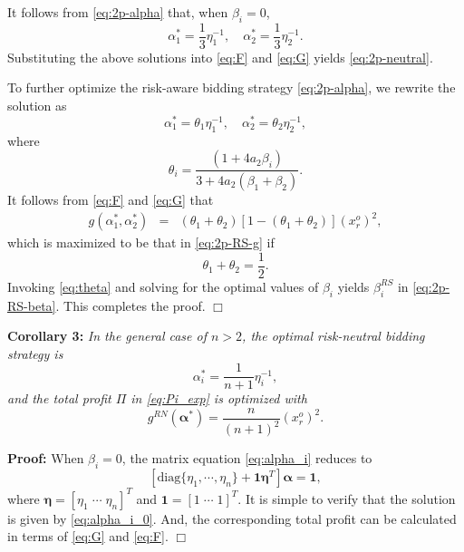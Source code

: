 \documentclass[conference]{IEEEtran}
\newcommand{\one}{\mathbf{1}}
\begin{document}
It follows from \eqref{eq:2p-alpha} that, when $\beta_i=0$,
\[ \alpha_1^* = \frac{1}{3}\eta_1^{-1}, \quad \alpha_2^* = \frac{1}{3}\eta_2^{-1}. \]
Substituting the above solutions into \eqref{eq:F} and \eqref{eq:G} yields \eqref{eq:2p-neutral}.

To further optimize the risk-aware bidding strategy \eqref{eq:2p-alpha}, we rewrite the solution as
\[ \alpha_1^* = \theta_1 \eta_1^{-1}, \quad \alpha_2^* = \theta_2\eta_2^{-1}, \]
where 
\begin{equation}
    \theta_i = \frac{(1+4a_2\beta_i)}{3+4a_2(\beta_1+\beta_2)}. \label{eq:theta}
\end{equation} 
It follows from \eqref{eq:F} and \eqref{eq:G} that 
\begin{eqnarray*}
    g(\alpha_1^*, \alpha_2^*) & = & (\theta_1+\theta_2) [1- (\theta_1+\theta_2)] (x_r^o)^2, 
\end{eqnarray*}
which is maximized to be that in \eqref{eq:2p-RS-g} if
\[ \theta_1+\theta_2=\frac{1}{2}. \]
Invoking \eqref{eq:theta} and solving for the optimal values of $\beta_i$ yields $\beta_i^{RS}$ in \eqref{eq:2p-RS-beta}. This completes the proof. \hfill $\Box$

\noindent  \textbf{Corollary 3:} {\it In the general case of $n>2$, the optimal risk-neutral bidding strategy is
\begin{equation}
    \alpha_i^* = \frac{1}{n+1}\eta_i^{-1},\label{eq:alpha_i_0} 
\end{equation} 
and the total profit $\Pi$ in \eqref{eq:Pi_exp} is optimized with 
\[ g^{RN}(\boldsymbol{\alpha}^*)=\frac{n}{(n+1)^2} (x_r^o)^2. \]}

\noindent \textbf{Proof:} When $\beta_i=0$, the matrix equation \eqref{eq:alpha_i} reduces to 
\[ \left[\mbox{diag}\{\eta_1,\cdots,\eta_n\} + \one \boldsymbol{\eta}^T \right] \boldsymbol{\alpha}=\one, \]
where $\boldsymbol{\eta}=[\eta_1 \; \cdots \; \eta_n]^T$ and $\one=[1 \; \cdots \; 1]^T$. It is simple to verify that the solution is given by \eqref{eq:alpha_i_0}. And, the corresponding total profit can be calculated in terms of \eqref{eq:G} and \eqref{eq:F}.  \hfill $\Box$
\end{document}
